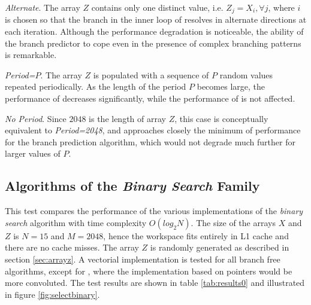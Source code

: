 \documentclass[preprint,1p,times]{elsarticle}
\begin{document}
\textit{Alternate}. The array $Z$ contains only one distinct value, i.e. $Z_j=X_i, \forall j$, where $i$ is chosen so that the branch in the inner loop of \textit{\ClassicName} resolves in alternate directions at each iteration. Although the performance degradation is noticeable, the ability of the branch predictor to cope even in the presence of complex branching patterns is remarkable.

\textit{Period=$P$}. The array $Z$ is populated with a sequence of $P$ random values repeated periodically. As the length of the period $P$ becomes large, the performance of \textit{\ClassicName} decreases significantly, while the performance of \textit{\ClassicModName} is not affected.

\textit{No Period}. Since $2048$ is the length of array $Z$, this case is conceptually equivalent to \textit{Period=2048}, and approaches closely the minimum of performance for the branch prediction algorithm, which would not degrade much further for larger values of $P$.

\subsection{Algorithms of the \textit{Binary Search} Family}
\label{sec:testbinalg}
This test compares the performance of the various implementations of the \textit{binary search} algorithm with time complexity $O(log_2N)$.
The size of the arrays $X$ and $Z$ is $N=15$ and $M=2048$, hence the workspace fits entirely in L1 cache and there are no cache misses.
The array $Z$ is randomly generated as described in section \ref{sec:arrayz}.
A vectorial implementation is tested for all branch free algorithms, except for \textit{\MorinOffsetName}, where the implementation based on pointers would be more convoluted.
The test results are shown in table \ref{tab:results0} and illustrated in figure \ref{fig:selectbinary}.
\end{document}
